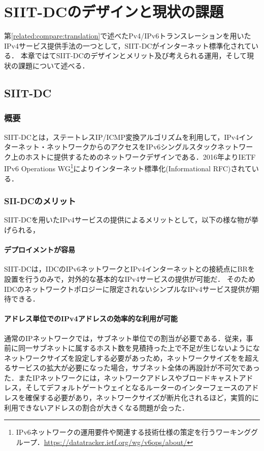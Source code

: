 \chapter{SIIT-DCのデザインと現状の課題}
\label{issue}
第\ref{related:compare:translation}で述べたPv4/IPv6トランスレーションを用いたIPv4サービス提供手法の一つとして，SIIT-DCがインターネット標準化されている．
本章ではてSIIT-DCのデザインとメリット及び考えられる運用，そして現状の課題について述べる．
\section{SIIT-DC}
\label{issue:siit-dc}


\subsection{概要}
SIIT-DCとは，ステートレスIP/ICMP変換アルゴリズム\cite{RFC7915}を利用して，IPv4インターネット・ネットワークからのアクセスをIPv6シングルスタックネットワーク上のホストに提供するためのネットワークデザインである．2016年よりIETF IPv6 Operations WG\footnote{IPv6ネットワークの運用要件や関連する技術仕様の策定を行うワーキンググループ．\url{https://datatracker.ietf.org/wg/v6ops/about/}}によりインターネット標準化(Informational RFC)されている\cite{RFC7755}．


\subsection{SII-DCのメリット}
\label{issue:siit-dc-merit}
SIIT-DCを用いたIPv4サービスの提供によるメリットとして，以下の様な物が挙げられる，

\subsubsection{デプロイメントが容易}
SIIT-DCは，IDCのIPv6ネットワークとIPv4インターネットとの接続点にBRを設置を行うのみで，対外的な基本的なIPv4サービスの提供が可能だ．
そのためIDCのネットワークトポロジーに限定されないシンプルなIPv4サービス提供が期待できる．

\subsubsection{アドレス単位でのIPv4アドレスの効率的な利用が可能}
通常のIPネットワークでは，サブネット単位での割当が必要である．従来，事前に同一サブネットに属するホスト数を見積持った上で不足が生じないようになネットワークサイズを設定しする必要があっため，ネットワークサイズをを超えるサービスの拡大が必要になった場合，サブネット全体の再設計が不可欠であった．またIPネットワークには，ネットワークアドレスやブロードキャストアドレス，そしてデフォルトゲートウェイとなるルーターのインターフェースのアドレスを確保する必要があり，ネットワークサイズが断片化されるほど，実質的に利用できないアドレスの割合が大きくなる問題が会った．

